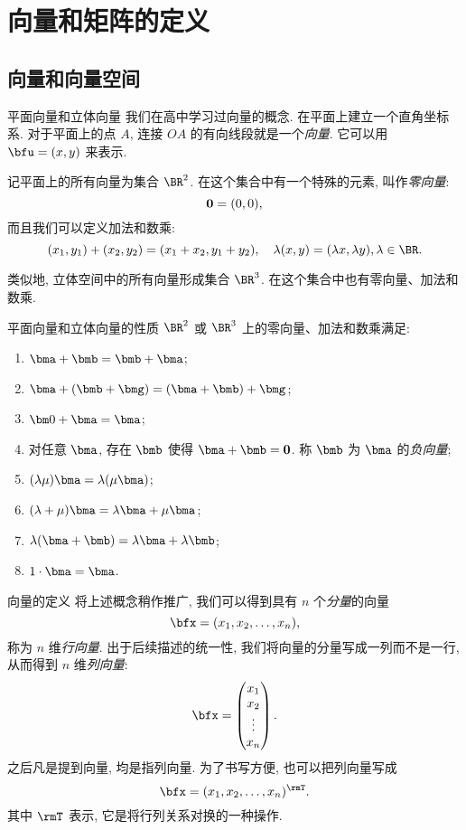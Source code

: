 \section{向量和矩阵的定义}


\subsection{向量和向量空间}
\begin{frame}{平面向量和立体向量}
	\onslide<+->
	我们在高中学习过向量的概念.
	\onslide<+->
	在平面上建立一个直角坐标系. 对于平面上的点 $A$, 连接 $OA$ 的有向线段就是一个\emph{向量}.
	\onslide<+->
	它可以用 $\bfu=(x,y)$ 来表示.

	\onslide<+->
	记平面上的所有向量为集合 $\BR^2$.
	\onslide<+->
	在这个集合中有一个特殊的元素, 叫作\emph{零向量}:
	\[{\bf0}=(0,0),\]
	\onslide<+->
	而且我们可以定义加法和数乘:
	\[(x_1,y_1)+(x_2,y_2)=(x_1+x_2,y_1+y_2),\quad
	\lambda(x,y)=(\lambda x,\lambda y),\lambda\in\BR.\]

	\onslide<+->
	类似地, 立体空间中的所有向量形成集合 $\BR^3$.
	\onslide<+->
	在这个集合中也有零向量、加法和数乘.
\end{frame}


\begin{frame}{平面向量和立体向量的性质}
	\onslide<+->
	$\BR^2$ 或 $\BR^3$ 上的零向量、加法和数乘满足:
	\begin{enumerate}\bf
		\item $\bma+\bmb=\bmb+\bma$;
		\item $\bma+(\bmb+\bmg)=(\bma+\bmb)+\bmg$;
		\item ${\bm0}+\bma=\bma$;
		\item 对任意 $\bma$, 存在 $\bmb$ 使得 $\bma+\bmb={\bf0}$. 称 $\bmb$ 为 $\bma$ 的\emph{负向量};
		\item $(\lambda\mu)\bma=\lambda(\mu\bma)$;
		\item $(\lambda+\mu)\bma=\lambda\bma+\mu\bma$;
		\item $\lambda(\bma+\bmb)=\lambda\bma+\lambda\bmb$;
		\item $1\cdot\bma=\bma$.
	\end{enumerate}
\end{frame}


\begin{frame}{向量的定义}
	\onslide<+->
	将上述概念稍作推广, 我们可以得到具有 $n$ 个\emph{分量}的向量
	\[\bfx=(x_1,x_2,\dots,x_n),\]
	称为 $n$ 维\emph{行向量}.
	\onslide<+->
	出于后续描述的统一性, 我们将向量的分量写成一列而不是一行, 从而得到 $n$ 维\emph{列向量}:
	\[\bfx=\begin{pmatrix}
		x_1\\
		x_2\\
		\vdots\\
		x_n
	\end{pmatrix}.\]
	\onslide<+->
	\alert{之后凡是提到向量, 均是指列向量}.
	\onslide<+->
	为了书写方便, 也可以把列向量写成
	\[\bfx=(x_1,x_2,\dots,x_n)^\rmT.\]
	其中 $\rmT$ 表示, 它是将行列关系对换的一种操作.
\end{frame}


